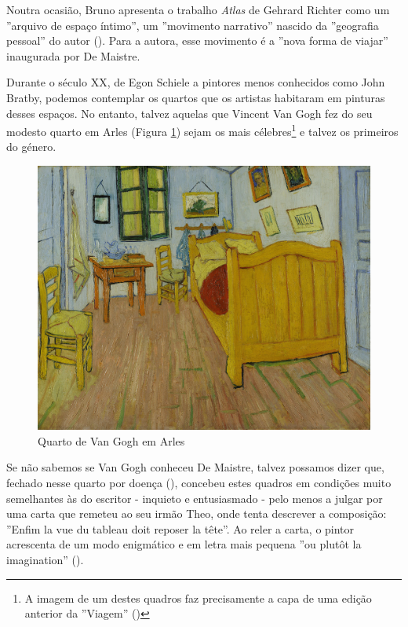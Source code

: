 \documentclass[12pt]{article}
\begin{document}
Noutra ocasião, Bruno apresenta o trabalho \emph{Atlas} de Gehrard
Richter como um ''arquivo de espaço íntimo'', um ''movimento
narrativo'' nascido da ''geografia pessoal'' do autor
(\cite[p.334]{bruno2002atlas}). Para a autora, esse movimento é a
''nova forma de viajar'' inaugurada por De Maistre.

Durante o século XX, de Egon Schiele a pintores menos conhecidos como
John Bratby, podemos contemplar os quartos que os artistas habitaram
em pinturas desses espaços. No entanto, talvez aquelas que Vincent Van
Gogh fez do seu modesto quarto em Arles (Figura \ref{fig:1}) sejam os
mais célebres\footnote{A imagem de um destes quadros faz precisamente
  a capa de uma edição anterior da ''Viagem'' (\cite{hedra})} e talvez
os primeiros do género.

\begin{figure}
  \centering\includegraphics[height=0.4\textheight,keepaspectratio] {slaapkamer.jpg}
  \caption{Quarto de Van Gogh em Arles}
  \label{fig:1}
\end{figure}

Se não sabemos se Van Gogh conheceu De Maistre, talvez possamos dizer
que, fechado nesse quarto por doença (\cite{facsimile2}), concebeu
estes quadros em condições muito semelhantes às do escritor - inquieto
e entusiasmado - pelo menos a julgar por uma carta que remeteu ao seu
irmão Theo, onde tenta descrever a composição: ''Enfim la vue du
tableau doit reposer la tête''. Ao reler a carta, o pintor acrescenta
de um modo enigmático e em letra mais pequena ''ou plutôt la
imagination'' (\cite{facsimile}).
\end{document}
